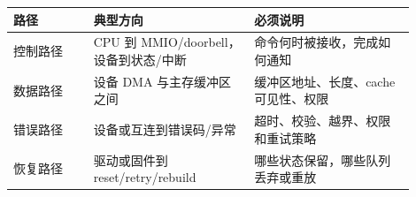 \begin{longtable}{L{0.18\linewidth}L{0.36\linewidth}L{0.36\linewidth}}
\toprule
路径 & 典型方向 & 必须说明 \\
\midrule
控制路径 & CPU 到 MMIO/doorbell，设备到状态/中断 & 命令何时被接收，完成如何通知 \\\tablerowrule
数据路径 & 设备 DMA 与主存缓冲区之间 & 缓冲区地址、长度、cache 可见性、权限 \\\tablerowrule
错误路径 & 设备或互连到错误码/异常 & 超时、校验、越界、权限和重试策略 \\\tablerowrule
恢复路径 & 驱动或固件到 reset/retry/rebuild & 哪些状态保留，哪些队列丢弃或重放 \\
\bottomrule
\end{longtable}

































































































